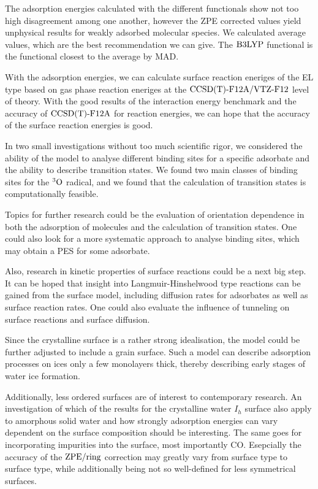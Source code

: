 \documentclass[8.5pt,twoside,twocolumn]{article}
\newcommand\zpe{\enmat{\te{ZPE}}}
\newcommand\zpering{\enmat{\zpe/\te{ring}}}
\newcommand\tripo{\enmat{{^3\te{O}}}}
\theoremstyle{standard}
\begin{document}
The adsorption energies calculated with the different functionals show not too
high disagreement among one another, however the ZPE corrected values yield
unphysical results for weakly adsorbed molecular species. We calculated average
values, which are the best recommendation we can give. The $\text{B3LYP}$ functional
is the functional closest to the average by MAD.

With the adsorption energies, we can calculate surface reaction eneriges of the
EL type based on gas phase reaction eneriges at the $\text{CCSD(T)-F12A}/\text{VTZ-F}12$ level of
theory. With the good results of the interaction energy benchmark and the
accuracy of $\text{CCSD(T)-F12A}$ for reaction energies, we can hope that the accuracy of
the surface reaction energies is good.

In two small investigations without too much scientific rigor, we considered the
ability of the model to analyse different binding sites for a specific adsorbate
and the ability to describe transition states. We found two main classes of
binding sites for the $\tripo$ radical, and we found that the calculation of
transition states is computationally feasible.

Topics for further research could be the evaluation of orientation dependence
in both the adsorption of molecules and the calculation of transition states.
One could also look for a more systematic approach to analyse binding sites,
which may obtain a PES for some adsorbate.

Also, research in kinetic properties of surface reactions could be a next big
step. It can be hoped that insight into Langmuir-Hinshelwood type reactions can
be gained from the surface model, including diffusion rates for adsorbates as
well as surface reaction rates. One could also evaluate the influence of
tunneling on surface reactions and surface diffusion.

Since the crystalline surface is a rather strong idealisation, the model could
be further adjusted to include a grain surface. Such a model can describe
adsorption processes on ices only a few monolayers thick, thereby describing
early stages of water ice formation.

Additionally, less ordered surfaces are of interest to contemporary research. An
investigation of which of the results for the crystalline water $I_h$ surface
also apply to amorphous solid water and how strongly adsorption energies can
vary dependent on the surface composition should be interesting. The same goes
for incorporating impurities into the surface, most importantly CO. Esepcially
the accuracy of the $\zpering$ correction may greatly vary from surface type to
surface type, while additionally being not so well-defined for less symmetrical
surfaces.
\end{document}
